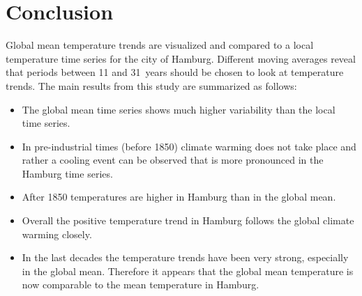 \documentclass[a4paper]{scrartcl}
\begin{document}
\section{Conclusion}

Global mean temperature trends are visualized and compared to a local temperature time series for the city of Hamburg. 
Different moving averages reveal that periods between 11 and 31~years should be chosen to look at temperature trends. 
The main results from this study are summarized as follows:
\begin{itemize}
 \item The global mean time series shows much higher variability than the local time series. 
 \item In pre-industrial times (before 1850) climate warming does not take place and rather a cooling event can be observed that is more pronounced in the Hamburg time series. 
 \item After 1850 temperatures are higher in Hamburg than in the global mean. 
 \item Overall the positive temperature trend in Hamburg follows the global climate warming closely. 
 \item In the last decades the temperature trends have been very strong, especially in the global mean. Therefore it appears that the global mean temperature is now comparable to the mean temperature in Hamburg. 
\end{itemize}
\end{document}

